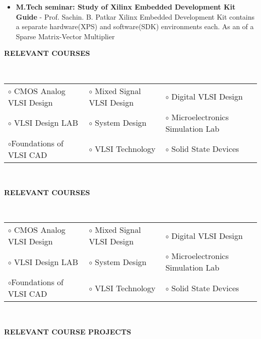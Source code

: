 \documentclass[a4paper,10pt]{article}
\begin{document}
\begin{itemize}
  \item \textbf{{M.Tech seminar: Study of Xilinx Embedded Development Kit}}\\
	{\textbf{Guide} - Prof. Sachin. B. Patkar \qquad\qquad\qquad\quad\qquad\qquad\qquad\quad\qquad\qquad\qquad\qquad\qquad\qquad\quad}
	Xilinx Embedded Development Kit contains a separate hardware(XPS) and software(SDK) environments each. As an  of a Sparse Matrix-Vector Multiplier

 \end{itemize}

 \colorbox{titleColor}{\parbox{6.5in}{\textbf{RELEVANT COURSES}}}\\
 
 \begin{tabular}{p{2in}p{2in}p{2.5in}}

$\circ$ CMOS Analog VLSI Design &$\circ$ Mixed Signal VLSI Design &$\circ$ Digital VLSI Design\\
$\circ$ VLSI Design LAB &$\circ$ System Design &$\circ$ Microelectronics Simulation Lab\\
$\circ$Foundations of VLSI CAD  &$\circ$ VLSI Technology &$\circ$ Solid State Devices
\end{tabular}\\

 \colorbox{titleColor}{\parbox{6.5in}{\textbf{RELEVANT COURSES}}}\\
 
 \begin{tabular}{p{2in}p{2in}p{2.5in}}

$\circ$ CMOS Analog VLSI Design &$\circ$ Mixed Signal VLSI Design &$\circ$ Digital VLSI Design\\
$\circ$ VLSI Design LAB &$\circ$ System Design &$\circ$ Microelectronics Simulation Lab\\
$\circ$Foundations of VLSI CAD  &$\circ$ VLSI Technology &$\circ$ Solid State Devices
\end{tabular}\\

 \colorbox{titleColor}{\parbox{6.5in}{\textbf{RELEVANT COURSE PROJECTS}}}
\end{document}

